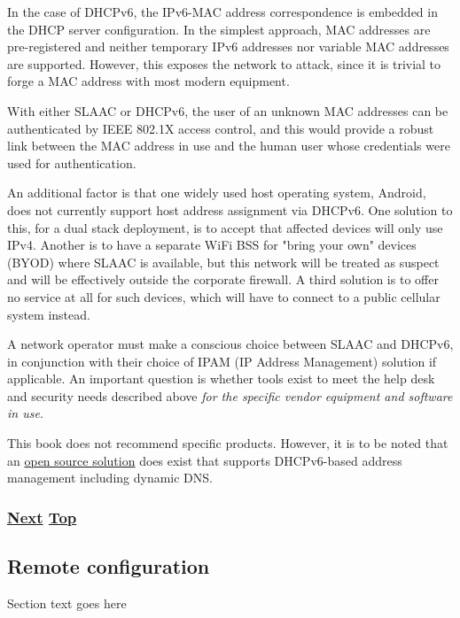 \documentclass[
]{article}
\begin{document}
In the case of DHCPv6, the IPv6-MAC address correspondence is embedded
in the DHCP server configuration. In the simplest approach, MAC
addresses are pre-registered and neither temporary IPv6 addresses nor
variable MAC addresses are supported. However, this exposes the network
to attack, since it is trivial to forge a MAC address with most modern
equipment.

With either SLAAC or DHCPv6, the user of an unknown MAC addresses can be
authenticated by IEEE 802.1X access control, and this would provide a
robust link between the MAC address in use and the human user whose
credentials were used for authentication.

An additional factor is that one widely used host operating system,
Android, does not currently support host address assignment via DHCPv6.
One solution to this, for a dual stack deployment, is to accept that
affected devices will only use IPv4. Another is to have a separate WiFi
BSS for "bring your own" devices (BYOD) where SLAAC is available, but
this network will be treated as suspect and will be effectively outside
the corporate firewall. A third solution is to offer no service at all
for such devices, which will have to connect to a public cellular system
instead.

A network operator must make a conscious choice between SLAAC and
DHCPv6, in conjunction with their choice of IPAM (IP Address Management)
solution if applicable. An important question is whether tools exist to
meet the help desk and security needs described above \emph{for the
specific vendor equipment and software in use}.

This book does not recommend specific products. However, it is to be
noted that an \href{https://www.isc.org/kea/}{open source solution} does
exist that supports DHCPv6-based address management including dynamic
DNS.

\subsubsection{\texorpdfstring{\hyperref[remote-configuration]{Next}
\hyperref[management-and-operations]{Top}}{Next Top}}\label{next-top-5}

\pagebreak

\subsection{Remote configuration}\label{remote-configuration}

Section text goes here
\end{document}
